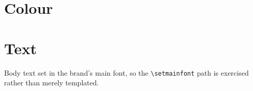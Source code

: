 \documentclass{brandofixture}
\begin{document}
\section{Colour}
\quad
{}\quad
{}\quad
{}

\section{Text}
Body text set in the brand's main font, so the \verb|\setmainfont| path is
exercised rather than merely templated.
\end{document}
